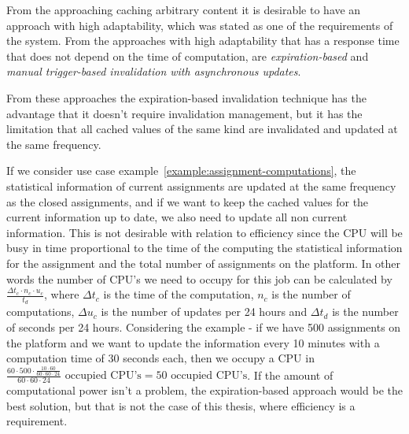 From the approaching caching arbitrary content it is desirable to have an approach with high adaptability, which was stated as one of the requirements of the system. From the approaches with high adaptability that has a response time that does not depend on the time of computation, are \emph{expiration-based} and \emph{manual trigger-based invalidation with asynchronous updates}.

From these approaches the expiration-based invalidation technique has the advantage that it doesn't require invalidation management, but it has the limitation that all cached values of the same kind are invalidated and updated at the same frequency.

If we consider use case example~\ref{example:assignment-computations}, the statistical information of current assignments are updated at the same frequency as the closed assignments, and if we want to keep the cached values for the current information up to date, we also need to update all non current information. This is not desirable with relation to efficiency since the CPU will be busy in time proportional to the time of the computing the statistical information for the assignment and the total number of assignments on the platform. In other words the number of CPU's we need to occupy for this job can be calculated by $\frac{\Delta t_c \cdot n_c \cdot u_c}{t_d}$, where $\Delta t_c$ is the time of the computation, $n_c$ is the number of computations, $\Delta u_c$ is the number of updates per 24 hours and $\Delta t_d$ is the number of seconds per 24 hours. Considering the example - if we have 500 assignments on the platform and we want to update the information every 10 minutes with a computation time of 30 seconds each, then we occupy a CPU in $\frac{60 \cdot 500 \cdot \frac{10 \cdot 60}{60 \cdot 60 \cdot 24}}{60 \cdot 60 \cdot 24}\text{ occupied CPU's} = 50\text{ occupied CPU's}$. If the amount of computational power isn't a problem, the expiration-based approach would be the best solution, but that is not the case of this thesis, where efficiency is a requirement.

